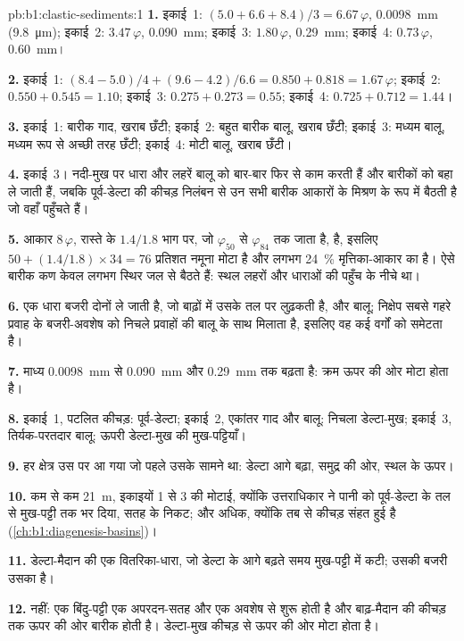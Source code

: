 \begin{solution}{pb:b1:clastic-sediments:1}
\textbf{1.} इकाई~1: $(5.0 + 6.6 + 8.4)/3 = 6.67\,\varphi$, \qty{0.0098}{mm}
(\qty{9.8}{\micro m}); इकाई~2: $3.47\,\varphi$, \qty{0.090}{mm}; इकाई~3:
$1.80\,\varphi$, \qty{0.29}{mm}; इकाई~4: $0.73\,\varphi$, \qty{0.60}{mm}।

\textbf{2.} इकाई~1: $(8.4 - 5.0)/4 + (9.6 - 4.2)/6.6 = 0.850 + 0.818 =
1.67\,\varphi$; इकाई~2: $0.550 + 0.545 = 1.10$; इकाई~3: $0.275 + 0.273 = 0.55$;
इकाई~4: $0.725 + 0.712 = 1.44$।

\textbf{3.} इकाई~1: बारीक गाद, खराब छँटी; इकाई~2: बहुत बारीक बालू, खराब
छँटी; इकाई~3: मध्यम बालू, मध्यम रूप से अच्छी तरह छँटी; इकाई~4: मोटी बालू,
खराब छँटी।

\textbf{4.} इकाई~3। नदी-मुख पर धारा और लहरें बालू को बार-बार फिर से काम करती हैं और बारीकों को बहा ले जाती हैं, जबकि पूर्व-डेल्टा की कीचड़ निलंबन से उन सभी बारीक आकारों के मिश्रण के रूप में बैठती है जो वहाँ पहुँचते हैं।

\textbf{5.} आकार $8\,\varphi$, रास्ते के $1.4/1.8$ भाग पर, जो $\varphi_{50}$ से $\varphi_{84}$ तक जाता है, है, इसलिए $50 + (1.4/1.8) \times 34 = 76$ प्रतिशत
नमूना मोटा है और लगभग \qty{24}{\percent} मृत्तिका-आकार का है। ऐसे बारीक कण केवल लगभग स्थिर जल से बैठते हैं: स्थल लहरों और धाराओं की पहुँच के नीचे था।

\textbf{6.} एक धारा बजरी दोनों ले जाती है, जो बाढ़ों में उसके तल पर लुढ़कती है, और बालू; निक्षेप सबसे गहरे प्रवाह के बजरी-अवशेष को निचले प्रवाहों की बालू के साथ मिलाता है, इसलिए वह कई वर्गों को समेटता है।

\textbf{7.} माध्य \qty{0.0098}{mm} से \qty{0.090}{mm} और
\qty{0.29}{mm} तक बढ़ता है: क्रम ऊपर की ओर मोटा होता है।

\textbf{8.} इकाई~1, पटलित कीचड़: पूर्व-डेल्टा; इकाई~2, एकांतर गाद और बालू: निचला डेल्टा-मुख; इकाई~3, तिर्यक-परतदार बालू: ऊपरी डेल्टा-मुख की मुख-पट्टियाँ।

\textbf{9.} हर क्षेत्र उस पर आ गया जो पहले उसके सामने था: डेल्टा आगे बढ़ा, समुद्र की ओर, स्थल के ऊपर।

\textbf{10.} कम से कम \qty{21}{m}, इकाइयों 1 से 3 की मोटाई, क्योंकि उत्तराधिकार ने पानी को पूर्व-डेल्टा के तल से मुख-पट्टी तक भर दिया, सतह के निकट; और अधिक, क्योंकि तब से कीचड़ संहत हुई है (\cref{ch:b1:diagenesis-basins})।

\textbf{11.} डेल्टा-मैदान की एक वितरिका-धारा, जो डेल्टा के आगे बढ़ते समय मुख-पट्टी में कटी; उसकी बजरी उसका  है।

\textbf{12.} नहीं: एक बिंदु-पट्टी एक अपरदन-सतह और एक अवशेष से शुरू होती है और बाढ़-मैदान की कीचड़ तक ऊपर की ओर बारीक होती है। डेल्टा-मुख कीचड़ से ऊपर की ओर मोटा होता है।


\end{solution}
